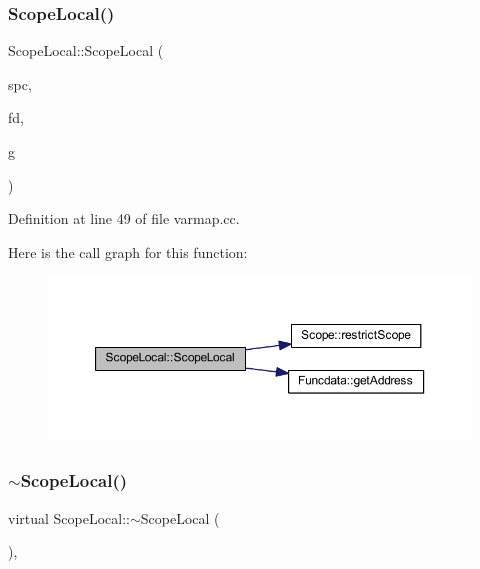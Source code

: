 \subsubsection{\texorpdfstring{ScopeLocal()}{ScopeLocal()}}
{\footnotesize\ttfamily Scope\+Local\+::\+Scope\+Local (\begin{DoxyParamCaption}\item[{\mbox{\hyperlink{class_addr_space}{Addr\+Space}} $\ast$}]{spc,  }\item[{\mbox{\hyperlink{class_funcdata}{Funcdata}} $\ast$}]{fd,  }\item[{\mbox{\hyperlink{class_architecture}{Architecture}} $\ast$}]{g }\end{DoxyParamCaption})}



Definition at line 49 of file varmap.\+cc.

Here is the call graph for this function\+:
\nopagebreak
\begin{figure}[H]
\begin{center}
\leavevmode
\includegraphics[width=350pt]{class_scope_local_ac254c3908b456ecd7f2f50ca5a7d3f4d_cgraph}
\end{center}
\end{figure}
\mbox{\label{class_scope_local_ad49851b4336a0a5b5e3327018f51b866}} 
\subsubsection{\texorpdfstring{$\sim$ScopeLocal()}{~ScopeLocal()}}
{\footnotesize\ttfamily virtual Scope\+Local\+::$\sim$\+Scope\+Local (\begin{DoxyParamCaption}\item[{void}]{ }\end{DoxyParamCaption})\hspace{0.3cm}{\ttfamily [inline]}, {\ttfamily [virtual]}}



